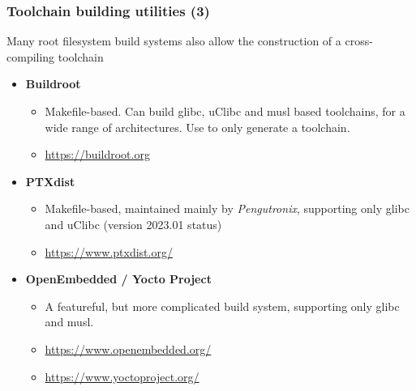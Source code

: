 \begin{frame}
\frametitle{Toolchain building utilities (3)}
Many root filesystem build systems also allow the construction of
a cross-compiling toolchain
\begin{itemize}
\item {\bf Buildroot}
  \begin{itemize}
  \item Makefile-based. Can build glibc, uClibc and musl based
    toolchains, for a wide range of architectures. Use 
    to only generate a toolchain.
  \item \url{https://buildroot.org}
  \end{itemize}
\item {\bf PTXdist}
  \begin{itemize}
  \item Makefile-based, maintained mainly by {\em Pengutronix},
        supporting only glibc and uClibc (version 2023.01 status)
  \item \url{https://www.ptxdist.org/}
  \end{itemize}
\item {\bf OpenEmbedded / Yocto Project}
  \begin{itemize}
  \item A featureful, but more complicated build system, supporting only
        glibc and musl.
  \item \url{https://www.openembedded.org/}
  \item \url{https://www.yoctoproject.org/}
  \end{itemize}
\end{itemize}
\end{frame}
%
